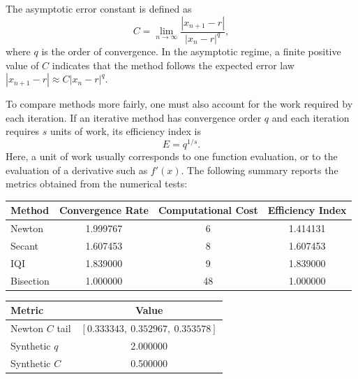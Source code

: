 The asymptotic error constant is defined as
\begin{equation*}
	C = \lim_{n \to \infty}
	\frac{\left| x_{n+1} - r \right|}
	     {\left| x_n - r \right|^q},
\end{equation*}
where $q$ is the order of convergence. In the asymptotic regime, a finite
positive value of $C$ indicates that the method follows the expected error law
$|x_{n+1}-r| \approx C |x_n-r|^q$.

To compare methods more fairly, one must also account for the work required by
each iteration. If an iterative method has convergence order $q$ and each
iteration requires $s$ units of work, its efficiency index is
\begin{equation*}
	E = q^{1/s}.
\end{equation*}
Here, a unit of work usually corresponds to one function evaluation, or to the
evaluation of a derivative such as $f'(x)$. The following summary reports the
metrics obtained from the numerical tests:

\begin{center}
	\centering
	\label{tab:nonlinear_method_metrics}
	\renewcommand{\arraystretch}{1.2}
	\begin{tabular}{l c c c}
		\toprule
		Method & Convergence Rate & Computational Cost & Efficiency Index \\
		\midrule
		Newton          & 1.999767                  & 6                           & 1.414131                  \\
		Secant          & 1.607453                  & 8                           & 1.607453                  \\
		IQI             & 1.839000                  & 9                           & 1.839000                  \\
		Bisection       & 1.000000                  & 48                          & 1.000000                  \\
		\bottomrule
	\end{tabular}
\end{center}

\begin{center}
	\centering
	\label{tab:nonlinear_newton_details}
	\renewcommand{\arraystretch}{1.2}
	\begin{tabular}{l c}
		\toprule
		Metric & Value \\
		\midrule
		Newton $C$ tail & $[0.333343,\ 0.352967,\ 0.353578]$ \\
		Synthetic $q$   & 2.000000                            \\
		Synthetic $C$   & 0.500000                            \\
		\bottomrule
	\end{tabular}
\end{center}


